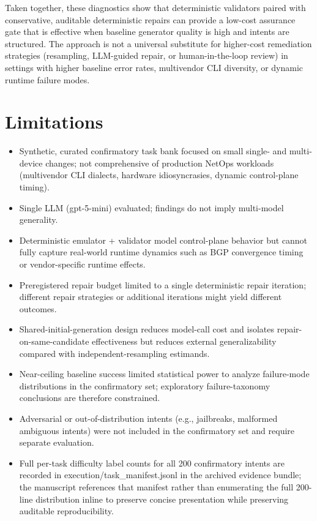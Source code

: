 \documentclass[conference]{IEEEtran}
\begin{document}
Taken together, these diagnostics show that deterministic validators paired with conservative, auditable deterministic repairs can provide a low-cost assurance gate that is effective when baseline generator quality is high and intents are structured. The approach is not a universal substitute for higher-cost remediation strategies (resampling, LLM-guided repair, or human-in-the-loop review) in settings with higher baseline error rates, multivendor CLI diversity, or dynamic runtime failure modes.

\section{Limitations}
\begin{itemize}
\item Synthetic, curated confirmatory task bank focused on small single- and multi-device changes; not comprehensive of production NetOps workloads (multivendor CLI dialects, hardware idiosyncrasies, dynamic control-plane timing).
\item Single LLM (gpt-5-mini) evaluated; findings do not imply multi-model generality.
\item Deterministic emulator + validator model control-plane behavior but cannot fully capture real-world runtime dynamics such as BGP convergence timing or vendor-specific runtime effects.
\item Preregistered repair budget limited to a single deterministic repair iteration; different repair strategies or additional iterations might yield different outcomes.
\item Shared-initial-generation design reduces model-call cost and isolates repair-on-same-candidate effectiveness but reduces external generalizability compared with independent-resampling estimands.
\item Near-ceiling baseline success limited statistical power to analyze failure-mode distributions in the confirmatory set; exploratory failure-taxonomy conclusions are therefore constrained.
\item Adversarial or out-of-distribution intents (e.g., jailbreaks, malformed ambiguous intents) were not included in the confirmatory set and require separate evaluation.
\item Full per-task difficulty label counts for all 200 confirmatory intents are recorded in execution/task\_manifest.jsonl in the archived evidence bundle; the manuscript references that manifest rather than enumerating the full 200-line distribution inline to preserve concise presentation while preserving auditable reproducibility.
\end{itemize}
\end{document}

